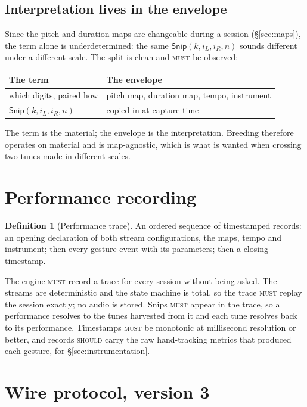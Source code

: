 \documentclass[11pt,a4paper]{article}
\newcommand{\MUST}{\textsc{must}}
\newcommand{\SHOULD}{\textsc{should}}
\theoremstyle{definition}
\newtheorem{definition}{Definition}
\theoremstyle{plain}
\theoremstyle{remark}
\begin{document}
\subsection{Interpretation lives in the envelope}
\label{sec:envelope}

Since the pitch and duration maps are changeable during a session (\S\ref{sec:maps}), the term
alone is underdetermined: the same $\mathsf{Snip}(k,i_L,i_R,n)$ sounds different under a different
scale. The split is clean and \MUST{} be observed:

\begin{center}
\begin{tabular}{ll}
\toprule
\textbf{The term} & \textbf{The envelope} \\
\midrule
which digits, paired how & pitch map, duration map, tempo, instrument \\
$\mathsf{Snip}(k,i_L,i_R,n)$ & copied in at capture time \\
\bottomrule
\end{tabular}
\end{center}

The term is the material; the envelope is the interpretation. Breeding therefore operates on
material and is map-agnostic, which is what is wanted when crossing two tunes made in different
scales.

\section{Performance recording}

\begin{definition}[Performance trace]
An ordered sequence of timestamped records: an opening declaration of both stream configurations,
the maps, tempo and instrument; then every gesture event with its parameters; then a closing
timestamp.
\end{definition}

The engine \MUST{} record a trace for every session without being asked. The streams are
deterministic and the state machine is total, so the trace \MUST{} replay the session exactly; no
audio is stored. Snips \MUST{} appear in the trace, so a performance resolves to the tunes harvested
from it and each tune resolves back to its performance. Timestamps \MUST{} be monotonic at
millisecond resolution or better, and records \SHOULD{} carry the raw hand-tracking metrics that
produced each gesture, for \S\ref{sec:instrumentation}.

\section{Wire protocol, version 3}
\label{sec:protocol}
\end{document}
